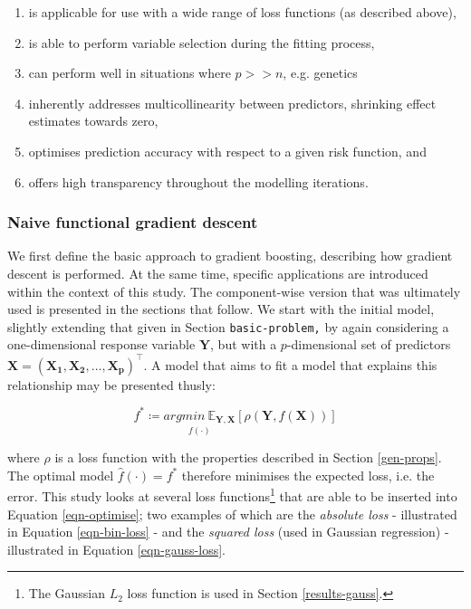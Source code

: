 \documentclass{article}
\begin{document}
\begin{enumerate}
\item is applicable for use with a wide range of loss functions (as described above),
\item is able to perform variable selection during the fitting process,
\item can perform well in situations where $p>>n$, e.g. genetics
\item inherently addresses multicollinearity between predictors, shrinking effect estimates towards zero,
\item optimises prediction accuracy with respect to a given risk function, and
\item offers high transparency throughout the modelling iterations.
\end{enumerate}


\subsubsection{Naive functional gradient descent \label{naive-boosting}}
\label{sec-5-3-3}

We first define the basic approach to gradient boosting, describing how gradient descent is performed. At the same time, specific applications are introduced within the context of this study. The component-wise version that was ultimately used is presented in the sections that follow.
We start with the initial model, slightly extending that given in Section \texttt{basic-problem,} by again considering a one-dimensional response variable $\mathbf{Y}$, but with a $p$-dimensional set of predictors $\mathbf{X = (X_1, X_2, … , X_p)^\top}$. A model that aims to fit a model that explains this relationship may be presented thusly:

\begin{equation}
  f^* \coloneqq \underset{f(\cdot)}{argmin{\ \mathbb{E}_{\mathbf{Y,X}}}}[\rho (\mathbf{Y}, f(\mathbf{X}))]
      \label{eqn-optimise}
\end{equation}

\vspace{3mm}

where $\rho$ is a loss function with the properties described in Section \ref{gen-props}. The optimal model $\hat f(\cdot) = f^*$ therefore minimises the expected loss, i.e. the error. This study looks at several loss functions\footnote{The Gaussian $L_2$ loss function is used in Section \ref{results-gauss}.} that are able to be inserted into Equation \eqref{eqn-optimise}; two examples of which are the \emph{absolute loss} - illustrated in Equation \eqref{eqn-bin-loss} - and the \emph{squared loss} (used in Gaussian regression) - illustrated in Equation \eqref{eqn-gauss-loss}.
\end{document}

